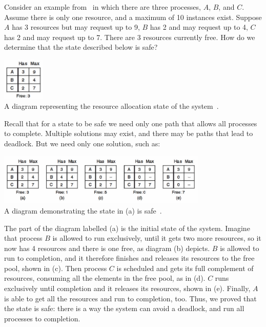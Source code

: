 Consider an example from~\cite{mos} in which there are three processes, $A$, $B$, and $C$. Assume there is only one resource, and a maximum of 10 instances exist. Suppose $A$ has 3 resources but may request up to 9, $B$ has 2 and may request up to 4, $C$ has 2 and may request up to 7. There are 3 resources currently free. How do we determine that the state described below is safe?

\begin{center}
\includegraphics[width=0.15\textwidth]{images/safe-state-initial.png}\\
A diagram representing the resource allocation state of the system~\cite{mos}.
\end{center}

Recall that for a state to be safe we need only one path that allows all processes to complete. Multiple solutions may exist, and there may be paths that lead to deadlock. But we need only one solution, such as:

\begin{center}
\includegraphics[width=0.75\textwidth]{images/safe-state.png}\\
A diagram demonstrating the state in (a) is safe~\cite{mos}.
\end{center}

The part of the diagram labelled (a) is the initial state of the system. Imagine that process $B$ is allowed to run exclusively, until it gets two more resources, so it now has 4 resources and there is one free, as diagram (b) depicts. $B$ is allowed to run to completion, and it therefore finishes and releases its resources to the free pool, shown in (c). Then process $C$ is scheduled and gets its full complement of resources, consuming all the elements in the free pool, as in (d). $C$ runs exclusively until completion and it releases its resources, shown in (e). Finally, $A$ is able to get all the resources and run to completion, too. Thus, we proved that the state is safe: there is a way the system can avoid a deadlock, and run all processes to completion.

